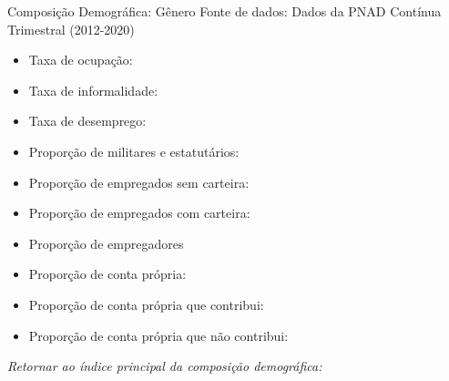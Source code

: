 \begin{frame}[label=_composicao_demografica_genero]{Composição Demográfica: Gênero}
{\footnotesize Fonte de dados: Dados da PNAD Contínua Trimestral (2012-2020)}
\begin{itemize}
\item{Taxa de ocupação: \hyperlink{_composicao_demografica_genero_taxa_de_ocupacao}{}}
\item{Taxa de informalidade: \hyperlink{_composicao_demografica_genero_taxa_de_informalidade}{}}
\item{Taxa de desemprego: \hyperlink{_composicao_demografica_genero_taxa_de_desemprego}{}}
\item{Proporção de militares e estatutários: \hyperlink{_composicao_demografica_genero_prop_militar}{}}
\item{Proporção de empregados sem carteira: \hyperlink{_composicao_demografica_genero_prop_empregadoSC}{}}
\item{Proporção de empregados com carteira: \hyperlink{_composicao_demografica_genero_prop_empregadoCC}{}}
\item{Proporção de empregadores \hyperlink{_composicao_demografica_genero_prop_empregador}{}}
\item{Proporção de conta própria: \hyperlink{_composicao_demografica_genero_prop_cpropria}{}}
\item{Proporção de conta própria que contribui: \hyperlink{_composicao_demografica_genero_prop_cpropriaC}{}}
\item{Proporção de conta própria que não contribui: \hyperlink{_composicao_demografica_genero_prop_cpropriaNc}{}}
\end{itemize}

\begin{small}
\textit{Retornar ao índice principal da composição demográfica: \hyperlink{_composicao_demografica}{} }
\end{small}

\end{frame}

